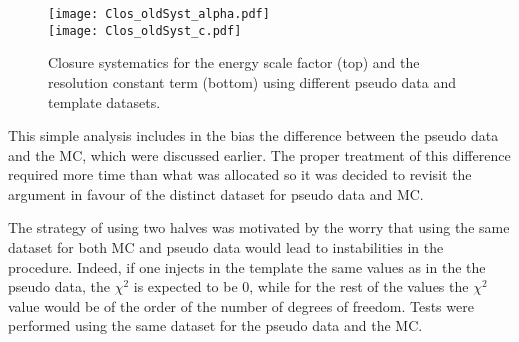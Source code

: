 \begin{enumerate}
\begin{figure}
\centering
\texttt{[image: Clos\_oldSyst\_alpha.pdf]}\\
\texttt{[image: Clos\_oldSyst\_c.pdf]}
\caption{\label{org3b08331}
Closure systematics for the energy scale factor (top) and the resolution constant  term (bottom) using different pseudo data and template datasets. \cite{Guerguichon_170420}}
\end{figure}


This simple analysis includes in the bias the difference between the pseudo data and the MC, which were discussed earlier.
The proper treatment of this difference required more time than what was allocated so it was decided to revisit the argument in favour of the distinct dataset for pseudo data and MC.

The strategy of using two halves was motivated by the worry that using the same dataset for both MC and pseudo data would lead to instabilities in the procedure.
Indeed, if one injects in the template the same values as in the the pseudo data, the $\chi^2$ is expected to be 0, while for the rest of the values the $\chi^2$ value would be of the order of the number of degrees of freedom.
Tests were performed using the same dataset for the pseudo data and the MC.


\end{enumerate}

